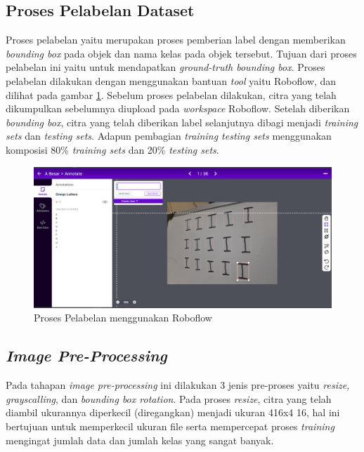 \subsection{Proses Pelabelan Dataset}
\label{subsec:proseslabelling}

Proses pelabelan yaitu merupakan proses pemberian label dengan memberikan \textit{bounding box} pada objek dan nama kelas pada objek tersebut. Tujuan dari proses pelabelan ini yaitu untuk mendapatkan \textit{ground-truth bounding box}. Proses pelabelan dilakukan dengan menggunakan bantuan \textit{tool} yaitu Roboflow, dan dilihat pada gambar \ref*{fig:labellingroboflow}. Sebelum proses pelabelan dilakukan, citra yang telah dikumpulkan sebelumnya diupload pada \textit{workspace} Roboflow. Setelah diberikan \textit{bounding box}, citra yang telah diberikan label selanjutnya dibagi menjadi \textit{training sets} dan \textit{testing sets}. Adapun pembagian \textit{training testing sets} menggunakan komposisi 80\% \textit{training sets} dan 20\% \textit{testing sets}. \par

\begin{figure}[H]
    \centering
    \includegraphics[scale=0.25]{gambar/labelling.png}
    \caption{Proses Pelabelan menggunakan Roboflow}
    \label{fig:labellingroboflow}
\end{figure}

\subsection{\textit{Image Pre-Processing}}
\label{subsec:imagepreprocess}

Pada tahapan \textit{image pre-processing} ini dilakukan 3 jenis pre-proses yaitu \textit{resize, grayscalling}, dan \textit{bounding box rotation}. Pada proses \textit{resize}, citra yang telah diambil ukurannya diperkecil (diregangkan) menjadi ukuran 416x4 16, hal ini bertujuan untuk memperkecil ukuran file serta mempercepat proses \textit{training} mengingat jumlah data dan jumlah kelas yang sangat banyak. \par

